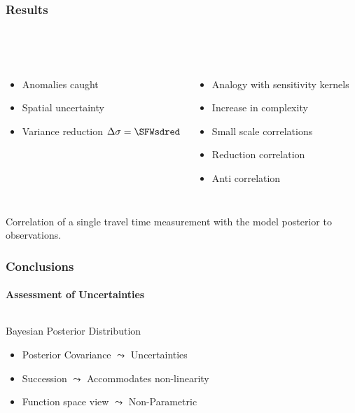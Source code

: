 \documentclass[aspectratio=169, t, 10pt,
    ]{beamer}
\begin{document}
\begin{frame}
    \frametitle{Results}
    \framesubtitle{~}

\begin{columns}
%

    \begin{itemize}
        \item Anomalies caught
        \item Spatial uncertainty
        \item Variance reduction $\Delta\sigma = \SFWsdred$
    \end{itemize}

    \begin{itemize}
        \item Analogy with sensitivity kernels
        \item Increase in complexity
        \item Small scale correlations
        \item Reduction correlation
        \item Anti correlation
    \end{itemize}


    \vspace{-10mm}
    \centering \scriptsize
\end{columns}

\end{frame}

Correlation of a single travel time measurement with the model posterior to observations.
\\


\begin{frame}
    \frametitle{Conclusions}
    \framesubtitle{Assessment of Uncertainties}

\begin{columns}
%

    \begin{exampleblock}{Bayesian Posterior Distribution}
    \begin{itemize}
        \item Posterior Covariance \hfill $\leadsto$ \hfill Uncertainties
        \item Succession \hfill $\leadsto$ \hfill Accommodates non-linearity
        \item Function space view \hfill $\leadsto$ \hfill Non-Parametric
    \end{itemize}
    \end{exampleblock}


    \vspace{-10mm}
    \centering
    \only{}
\end{columns}

\end{frame}
\end{document}
